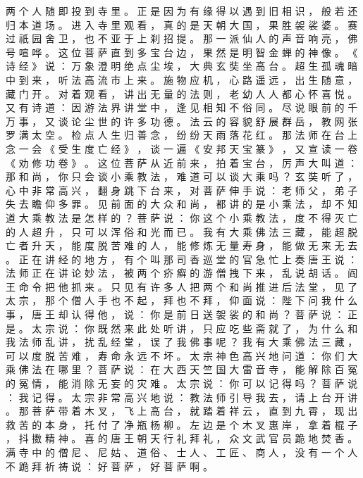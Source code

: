 {两 个 人 随 即 投 到 寺 里 。
正 是 因 为 有 缘 得 以 遇 到 旧 相 识 ， 般 若 还 归 本 道 场 。
进 入 寺 里 观 看 ， 真 的 是 天 朝 大 国 ， 果 胜 袈 裟 婆 。
赛 过 祇 园 舍 卫 ， 也 不 亚 于 上 刹 招 提 。
那 一 派 仙 人 的 声 音 响 亮 ， 佛 号 喧 哗 。
这 位 菩 萨 直 到 多 宝 台 边 ， 果 然 是 明 智 金 蝉 的 神 像 。
《 诗 经 》 说 ： 万 象 澄 明 绝 点 尘 埃 ， 大 典 玄 奘 坐 高 台 。
超 生 孤 魂 暗 中 到 来 ， 听 法 高 流 市 上 来 。
施 物 应 机 ， 心 路 遥 远 ， 出 生 随 意 ， 藏 门 开 。
对 着 观 看 ， 讲 出 无 量 的 法 则 ， 老 幼 人 人 都 心 怀 喜 悦 。
又 有 诗 道 ： 因 游 法 界 讲 堂 中 ， 逢 见 相 知 不 俗 同 。
尽 说 眼 前 的 千 万 事 ， 又 谈 论 尘 世 的 许 多 功 德 。
法 云 的 容 貌 舒 展 群 岳 ， 教 网 张 罗 满 太 空 。
检 点 人 生 归 善 念 ， 纷 纷 天 雨 落 花 红 。
那 法 师 在 台 上 念 一 会 《 受 生 度 亡 经 》 ， 谈 一 遍 《 安 邦 天 宝 篆 》 ， 又 宣 读 一 卷 《 劝 修 功 卷 》 。
这 位 菩 萨 从 近 前 来 ， 拍 着 宝 台 ， 厉 声 大 叫 道 ： 那 和 尚 ， 你 只 会 谈 小 乘 教 法 ， 难 道 可 以 谈 大 乘 吗 ？ 玄 奘 听 了 ， 心 中 非 常 高 兴 ， 翻 身 跳 下 台 来 ， 对 菩 萨 伸 手 说 ： 老 师 父 ， 弟 子 失 去 瞻 仰 多 罪 。
见 前 面 的 大 众 和 尚 ， 都 讲 的 是 小 乘 法 ， 却 不 知 道 大 乘 教 法 是 怎 样 的 ？
菩 萨 说 ： 你 这 个 小 乘 教 法 ， 度 不 得 灭 亡 的 人 超 升 ， 只 可 以 浑 俗 和 光 而 已 。
我 有 大 乘 佛 法 三 藏 ， 能 超 脱 亡 者 升 天 ， 能 度 脱 苦 难 的 人 ， 能 修 炼 无 量 寿 身 ， 能 做 无 来 无 去 。
正 在 讲 经 的 地 方 ， 有 个 叫 那 司 香 巡 堂 的 官 急 忙 上 奏 唐 王 说 ： 法 师 正 在 讲 论 妙 法 ， 被 两 个 疥 癣 的 游 僧 拽 下 来 ， 乱 说 胡 话 。
阎 王 命 令 把 他 抓 来 。
只 见 有 许 多 人 把 两 个 和 尚 推 进 后 法 堂 ， 见 了 太 宗 ， 那 个 僧 人 手 也 不 起 ， 拜 也 不 拜 ， 仰 面 说 ： 陛 下 问 我 什 么 事 ， 唐 王 却 认 得 他 ， 说 ： 你 是 前 日 送 袈 裟 的 和 尚 ？ 菩 萨 说 ： 正 是 。
太 宗 说 ： 你 既 然 来 此 处 听 讲 ， 只 应 吃 些 斋 就 了 ， 为 什 么 和 我 法 师 乱 讲 ， 扰 乱 经 堂 ， 误 了 我 佛 事 呢 ？
我 有 大 乘 佛 法 三 藏 ， 可 以 度 脱 苦 难 ， 寿 命 永 远 不 坏 。
太 宗 神 色 高 兴 地 问 道 ： 你 们 大 乘 佛 法 在 哪 里 ？ 菩 萨 说 ： 在 大 西 天 竺 国 大 雷 音 寺 ， 能 解 除 百 冤 的 冤 情 ， 能 消 除 无 妄 的 灾 难 。
太 宗 说 ： 你 可 以 记 得 吗 ？ 菩 萨 说 ： 我 记 得 。
太 宗 非 常 高 兴 地 说 ： 教 法 师 引 导 我 去 ， 请 上 台 开 讲 。
那 菩 萨 带 着 木 叉 ， 飞 上 高 台 ， 就 踏 着 祥 云 ， 直 到 九 霄 ， 现 出 救 苦 的 本 身 ， 托 付 了 净 瓶 杨 柳 。
左 边 是 个 木 叉 惠 岸 ， 拿 着 棍 子 ， 抖 擞 精 神 。
喜 的 唐 王 朝 天 行 礼 拜 礼 ， 众 文 武 官 员 跪 地 焚 香 。
满 寺 中 的 僧 尼 、 尼 姑 、 道 俗 、 士 人 、 工 匠 、 商 人 ， 没 有 一 个 人 不 跪 拜 祈 祷 说 ： 好 菩 萨 ， 好 菩 萨 啊 。
}
